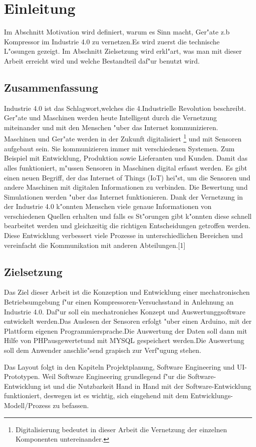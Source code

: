 \section{Einleitung}
%

Im Abschnitt Motivation  wird definiert, warum es Sinn macht, Ger"ate z.b Kompressor 
im Industrie 4.0 zu vernetzen.Es wird zuerst die technische L"osungen gezeigt. 
Im Abschnitt Zielsetzung wird erkl"art, was man mit dieser Arbeit 
erreicht wird und welche Bestandteil daf"ur benutzt wird.
\subsection{Zusammenfassung}

Industrie 4.0 ist das Schlagwort,welches die 4.Industrielle Revolution beschreibt.
Ger"ate und Maschinen werden heute Intelligent durch die Vernetzung miteinander und
 mit den Menschen "uber das Internet kommunizieren.
Maschinen und Ger"ate werden in der Zukunft digitalisiert 
\footnote{Digitalisierung bedeutet in dieser Arbeit die Vernetzung der einzelnen Komponenten untereinander.} 
und mit Sensoren aufgebaut sein.
Sie kommunizieren immer mit verschiedenen Systemen.
 Zum Beispiel mit
Entwicklung, Produktion  sowie Lieferanten und Kunden.
Damit das alles funktioniert, m"ussen Sensoren in Maschinen
digital erfasst werden. Es gibt einen neuen Begriff,
der das Internet of Things (IoT) hei"st, um die Sensoren
und andere Maschinen mit digitalen Informationen zu verbinden.
Die Bewertung und Simulationen werden "uber das Internet funktionieren.
Dank der Vernetzung in der Industrie 4.0 k"onnten Menschen viele
genaue Informationen von verschiedenen Quellen erhalten und falls
es St"orungen gibt k"onnten diese schnell bearbeitet werden und gleichzeitig 
die richtigen Entscheidungen getroffen werden. 
Diese Entwicklung verbessert viele Prozesse in unterschiedlichen
Bereichen und vereinfacht die Kommunikation mit anderen Abteilungen.[1]
\subsection{Zielsetzung}

Das Ziel dieser Arbeit ist die Konzeption und Entwicklung einer
mechatronischen Betriebsumgebung f"ur einen Kompressoren-Versuchsstand
in Anlehnung an Industrie 4.0.
Daf"ur soll ein mechatroniches Konzept und Auswertunggsoftware 
entwickelt werden.Das Auslesen der Sensoren erfolgt "uber einen Arduino,
mit der Plattform eigenen Programmiersprache.Die Auswertung der Daten 
soll dann mit Hilfe von PHPausgewertetund mit MYSQL gespeichert werden.Die
Auswertung soll dem Anwender anschlie"send grapisch zur Verf"ugung stehen.
 

Das Layout folgt in den Kapiteln Projektplanung, Software Engineering
und UI-Prototypen. Weil Software Engineering grundlegend f"ur die
Software-Entwicklung ist und die Nutzbarkeit Hand in Hand mit der
Software-Entwicklung funktioniert, deswegen ist es wichtig,
sich eingehend mit dem Entwicklungs-Modell/Prozess zu befassen.

